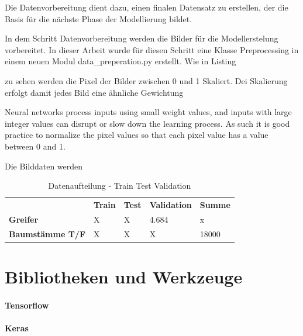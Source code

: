 Die Datenvorbereitung dient dazu, einen finalen Datensatz zu erstellen, der die Basis für die nächste Phase der Modellierung bildet.


			In dem Schritt Datenvorbereitung werden die Bilder für die Modellerstelung vorbereitet. In dieser Arbeit wurde für diesen Schritt eine Klasse Preprocessing in einem neuen Modul data\_preperation.py  erstellt. Wie in Listing 
			
			 zu sehen werden die Pixel der Bilder zwischen 0 und 1 Skaliert. Dei Skalierung erfolgt damit jedes Bild eine ähnliche Gewichtung
			
			Neural networks process inputs using small weight values, and inputs with large integer values can disrupt or slow down the learning process. As such it is good practice to normalize the pixel values so that each pixel value has a value between 0 and 1.
			
			Die Bilddaten werden 		
			

 

	\begin{table}[ht]
	\centering
	\begin{tabularx}{\textwidth}{lllll}
		 & \textbf{Train} & \textbf{Test}  & \textbf{Validation} & \textbf{Summe} 								  \\
		\textbf{Greifer} 				 & 	X					&	X					& 4.684 				   & x 				\\
		\textbf{Baumstämme T/F}	 	  &  X					 &	X					 &	X							& 18000		\\
	\end{tabularx}
	\caption{Datenaufteilung - Train Test Validation}
	\label{table:DatenaufteilungTrainTestValidation}
 	\end{table}
 
	\section{Bibliotheken und Werkzeuge}
	\label{sec:BibliothekenundWerkzeuge}
		\paragraph{Tensorflow}
		\paragraph{Keras}
